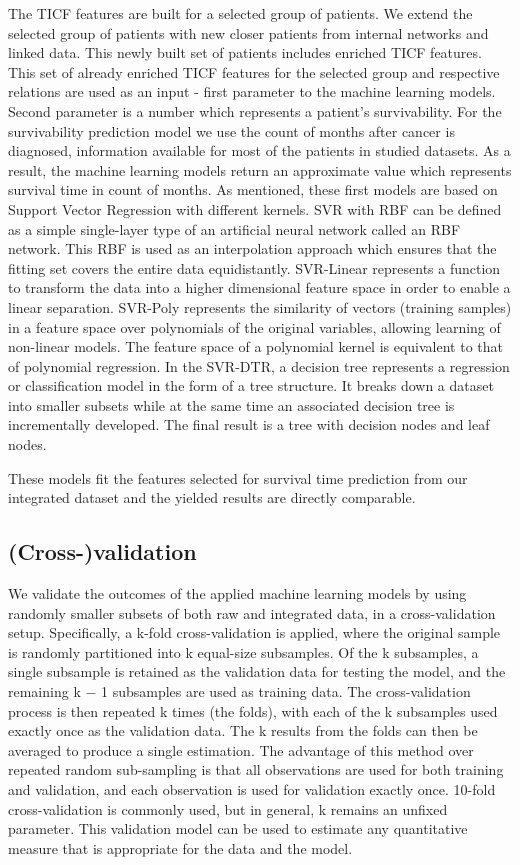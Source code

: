 \documentclass{bmcart}
\begin{document}
The TICF features are built for a selected group of patients. We extend the selected group of patients with new closer patients from internal networks and linked data. This newly built set of patients includes enriched TICF features. This set of already enriched TICF features for the selected group and respective relations are used as an input - first parameter to the machine learning models. Second parameter is a number which represents a patient{\textquoteright}s survivability. For the
survivability prediction model we use the count of months after cancer
is diagnosed, information available for most of the patients in studied
datasets. As a result, the machine learning models return an
approximate value which represents survival time in count of months. As
mentioned, these first models are based on Support Vector Regression
with different kernels. SVR with RBF can be defined as a simple
single-layer type of an artificial neural network called an RBF
network. This RBF is used as an interpolation approach which ensures
that the fitting set covers the entire data equidistantly. SVR-Linear
represents a function to  transform the data into a higher dimensional
feature space in order to enable a linear separation. SVR-Poly
represents the similarity of vectors (training samples) in a feature
space over polynomials of the original variables, allowing learning of
non-linear models. The feature space of a polynomial kernel is
equivalent to that of polynomial regression. In the SVR-DTR, a decision
tree represents a regression or classification model in the form of a
tree structure. It breaks down a dataset into smaller subsets while at
the same time an associated decision tree is incrementally developed.
The final result is a tree with decision nodes and leaf nodes.

These models fit the features selected for survival time prediction from
our integrated dataset and the yielded results are directly comparable.


\subsection{(Cross-)validation}

We validate the outcomes of the applied machine learning models by using
randomly smaller subsets of both raw and integrated data, in a
cross-validation setup. Specifically, a k{}-fold cross-validation is
applied, where the original sample is randomly partitioned into k
equal-size subsamples. Of the k subsamples, a single subsample is
retained as the validation data for testing the model, and the
remaining k $-$ 1 subsamples are used as training data. The
cross-validation process is then repeated k times (the folds), with
each of the k subsamples used exactly once as the validation data. The
k results from the folds can then be averaged to produce a single
estimation. The advantage of this method over repeated random
sub-sampling is that all observations are used for both training and
validation, and each observation is used for validation exactly once.
10-fold cross-validation is commonly used, but in general, k remains an
unfixed parameter. This validation model can be used to estimate any
quantitative measure that is appropriate for the data and the model. 
\end{document}

